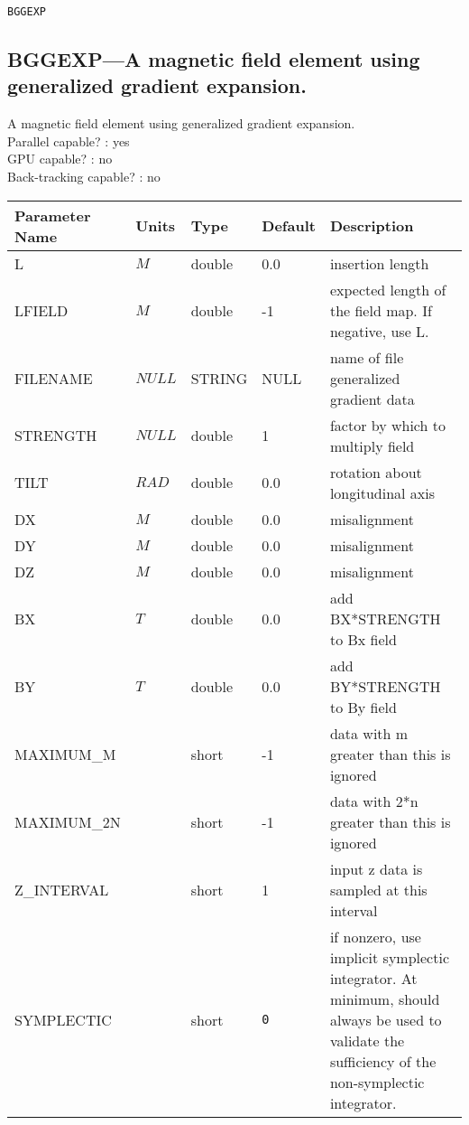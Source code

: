 \vspace*{0.5in}

\newpage
\begin{center}{\Large\verb|BGGEXP|}\end{center}
\subsection{BGGEXP---A magnetic field element using generalized gradient expansion.}
A magnetic field element using generalized gradient expansion.
\\
Parallel capable? : yes\\
GPU capable? : no\\
Back-tracking capable? : no\\
\begin{tabular}{|l|l|l|l|p{\descwidth}|} \hline
Parameter Name & Units & Type & Default & Description \\ \hline 
L & $M$ & double &  0.0 & insertion length  \\ \hline 
LFIELD & $M$ & double &   -1 & expected length of the field map. If negative, use L.  \\ \hline 
FILENAME & $NULL$ & STRING &   NULL            & name of file generalized gradient data  \\ \hline 
STRENGTH & $NULL$ & double &   1 & factor by which to multiply field  \\ \hline 
TILT & $RAD$ & double &  0.0 & rotation about longitudinal axis  \\ \hline 
DX & $M$ & double &  0.0 & misalignment  \\ \hline 
DY & $M$ & double &  0.0 & misalignment  \\ \hline 
DZ & $M$ & double &  0.0 & misalignment  \\ \hline 
BX & $T$ & double &  0.0 & add BX*STRENGTH to Bx field  \\ \hline 
BY & $T$ & double &  0.0 & add BY*STRENGTH to By field  \\ \hline 
MAXIMUM\_M &  & short &   -1              & data with m greater than this is ignored  \\ \hline 
MAXIMUM\_2N &  & short &   -1              & data with 2*n greater than this is ignored  \\ \hline 
Z\_INTERVAL &  & short &   1               & input z data is sampled at this interval  \\ \hline 
SYMPLECTIC &  & short &  \verb|0| & if nonzero, use implicit symplectic integrator. At minimum, should always be used to validate the sufficiency of the non-symplectic integrator.  \\ \hline 

\end{tabular}
